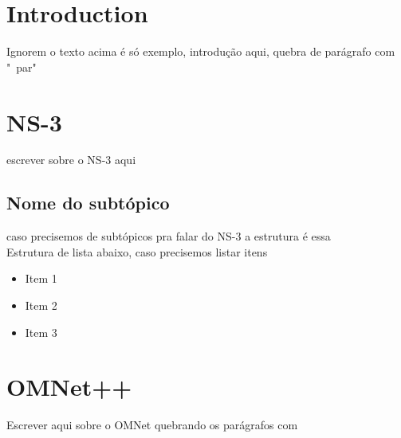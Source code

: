 \documentclass[10pt,conference]{./IEEEtran}
\begin{document}
	\section{Introduction}

	Ignorem o texto acima é só exemplo, introdução aqui, quebra de parágrafo com  "\ par"


	\section{NS-3}
	escrever sobre o NS-3 aqui


	\subsection{Nome do subtópico}
	caso precisemos de subtópicos pra falar do NS-3 a estrutura é essa \\ %


	Estrutura de lista abaixo, caso precisemos listar itens
	\begin{itemize}
		\item Item 1
		
		\item Item 2 
		
		\item Item 3
	\end{itemize}


	\section{OMNet++}  
	Escrever aqui sobre o OMNet quebrando os parágrafos com \par
\end{document}
